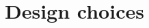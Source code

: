 \documentclass[letterpaper, 10 pt, conference]{ieeeconf}  %
\begin{document}




\section{Design choices}
\end{document}
